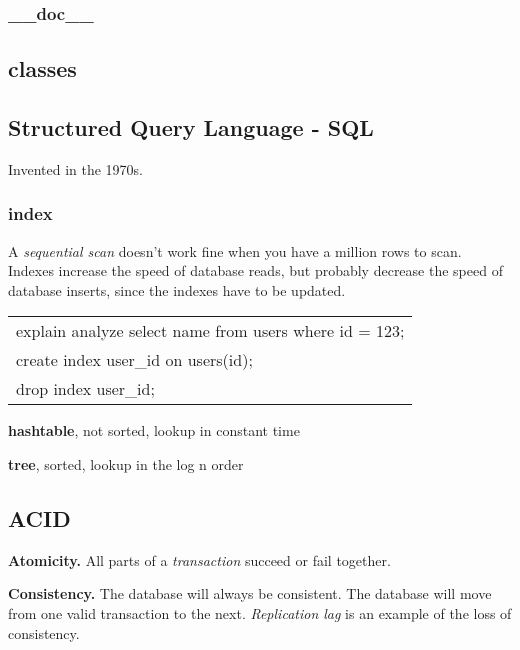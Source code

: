 \documentclass[12pt]{article}
\begin{document}


\subsubsection{\_\_doc\_\_}






\subsection{classes}




\subsection{Structured Query Language - SQL}

Invented in the 1970s.



\subsubsection{index}

A \emph{sequential scan} doesn't work fine when you have a million rows to scan. Indexes increase the speed of database reads, but probably decrease the speed of database inserts, since the indexes have to be updated.

\begin{tabular}{l}
explain analyze select name from users where id = 123; \\
create index user\_id on users(id); \\
drop index user\_id;
\end{tabular}

\textbf{hashtable}, not sorted, lookup in constant time

\textbf{tree}, sorted, lookup in the log n order



\subsection{ACID}

\textbf{Atomicity.} All parts of a \emph{transaction} succeed or fail together.

\textbf{Consistency.} The database will always be consistent. The database will move from one valid transaction to the next. \emph{Replication lag} is an example of the loss of consistency.
\end{document}
